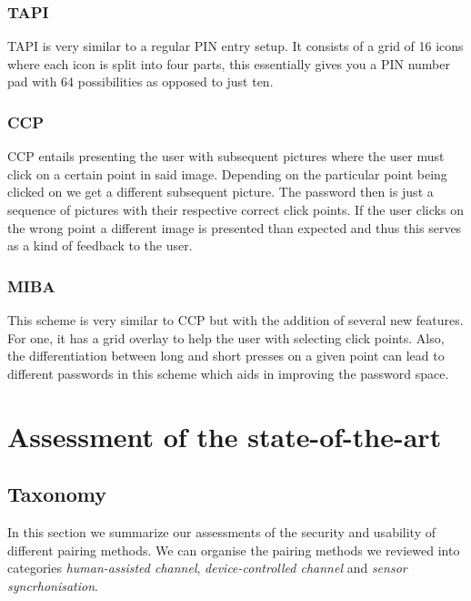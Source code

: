 \documentclass[conference, 12pt]{sty/IEEEtran}
\begin{document}
\subsubsection{TAPI}
\label{sssec:tapi}

TAPI is very similar to a regular PIN entry setup.
It consists of a grid of 16 icons where each icon is split into four parts, this essentially gives you a PIN number pad with 64 possibilities as opposed to just ten.

\subsubsection{CCP}
\label{sssec:ccp}

CCP entails presenting the user with subsequent pictures where the user must click on a certain point in said image.
Depending on the particular point being clicked on we get a different subsequent picture.
The password then is just a sequence of pictures with their respective correct click points.
If the user clicks on the wrong point a different image is presented than expected and thus this serves as a kind of feedback to the user.

\subsubsection{MIBA}
\label{sssec:miba}

This scheme is very similar to CCP but with the addition of several new features.
For one, it has a grid overlay to help the user with selecting click points.
Also, the differentiation between long and short presses on a given point can lead to different passwords in this scheme which aids in improving the password space.

\section{Assessment of the state-of-the-art}
\label{sec:assessment_of_the_state_of_the_art}

\subsection{Taxonomy}
In this section we summarize our assessments of the security and usability of different pairing methods.
We can organise the pairing methods we reviewed into categories \emph{human-assisted channel}, \emph{device-controlled channel} and \emph{sensor syncrhonisation}.
\end{document}
